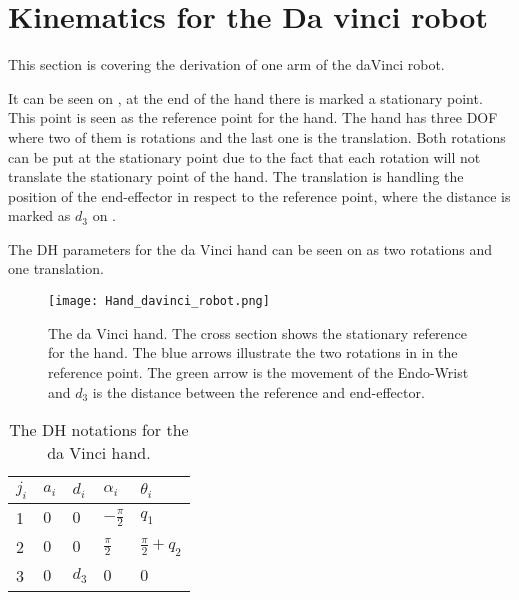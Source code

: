 \section{Kinematics for the Da vinci robot}
This section is covering the derivation of one arm of the daVinci robot.

It can be seen on , at the end of the hand there is marked a stationary point. This point is seen as the reference point for the hand. The hand has three DOF where two of them is rotations and the last one is the translation. Both rotations can be put at the stationary point due to the fact that each rotation will not translate the stationary point of the hand. The translation is handling the position of the end-effector in respect to the reference point, where the distance is marked as $d_3$ on .

The DH parameters for the da Vinci hand can be seen on  as two rotations and one translation.

\begin{figure}[H]
		\centering
		\texttt{[image: Hand\_davinci\_robot.png]}
		\caption{The da Vinci hand. The cross section shows the stationary reference for the hand. The blue arrows illustrate the two rotations in in the reference point. The green arrow is the movement of the Endo-Wrist and $d_3$ is the distance between the reference and end-effector.}
		\label{fig:da_hand_kino}
\end{figure}


\begin{table}[H]
\centering
\begin{tabular}{|l|l|l|l|l|}
	\hline
 	$j_i$ 	  & $a_i$    & $d_i$ & $\alpha_i$ 		 & $\theta_i$ 			   	 \\ \hline
 	1  	  	  &  $0$     & $0$ 	 & $-\frac{\pi}{2}$	 		 & $q_1$ 			    	 \\ \hline
 	2  		  &  $0$   	 & $0$ 	 & $ \frac{\pi}{2}$ 	 & $\frac{\pi}{2}+q_2$ 		 \\ \hline
 	3 	 	  &  $0$	 & $d_3$ & $0$ 		 		 & $0$ 					 \\ \hline
\end{tabular}
\caption{The DH notations for the da Vinci hand.}
\label{tab:DH_notation_hand}
\end{table}


